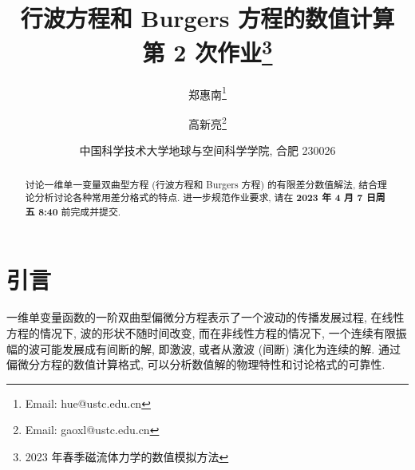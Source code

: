 \documentclass[10.5pt
]{article}
\def\due{2023 年 4 月 7 日周五 8:40}
\def\Term{2023 年春季}
\def\Course{磁流体力学的数值模拟方法}
\begin{document}
\title{行波方程和 Burgers 方程的数值计算 \\
  第 2 次作业\footnote{\Term\Course}}

\author{
  郑惠南\footnote{Email: hue@ustc.edu.cn}
  \and
  高新亮\footnote{Email: gaoxl@ustc.edu.cn}
}

\date{%
\scriptsize%
中国科学技术大学地球与空间科学学院, 合肥 230026
%
}


\maketitle

\begin{abstract}
讨论一维单一变量双曲型方程 (行波方程和 Burgers 方程) 的有限差分数值解法,
结合理论分析讨论各种常用差分格式的特点. 进一步规范作业要求,
请在 \textbf{\due} 前完成并提交.
\end{abstract}

\section{引言}
一维单变量函数的一阶双曲型偏微分方程表示了一个波动的传播发展过程, 在线性方程的情况下,
波的形状不随时间改变, 而在非线性方程的情况下, 一个连续有限振幅的波可能发展成有间断的解, 即激波, 或者从激波 (间断) 演化为连续的解\citep{Whitham1999}.
通过偏微分方程的数值计算格式, 可以分析数值解的物理特性和讨论格式的可靠性.
\end{document}
